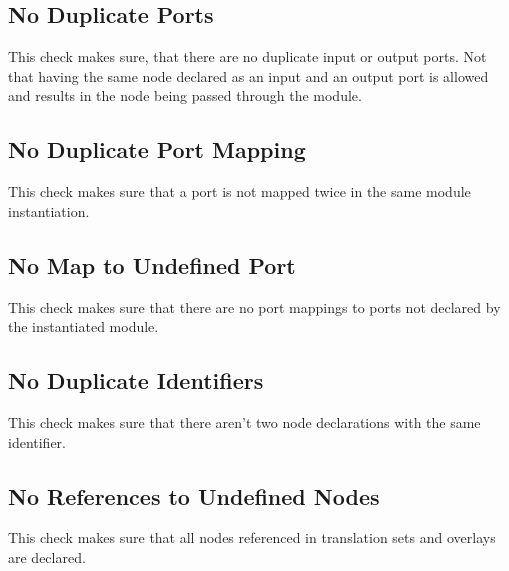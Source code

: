 \documentclass[a4paper,11pt,twoside]{report}
\begin{document}
{{{\subsection{No Duplicate Ports}
This check makes sure, that there are no duplicate input or output ports.
Not that having the same node declared as an input and an output port is allowed and results in the node being passed through the module.


\subsection{No Duplicate Port Mapping}
This check makes sure that a port is not mapped twice in the same module instantiation.

\subsection{No Map to Undefined Port}
This check makes sure that there are no port mappings to ports not declared by the instantiated module.


\subsection{No Duplicate Identifiers}
\label{sec:check_dupl_ident}
This check makes sure that there aren't two node declarations with the same identifier.

\subsection{No References to Undefined Nodes}
This check makes sure that all nodes referenced in translation sets and overlays are declared.


}}}
\end{document}
